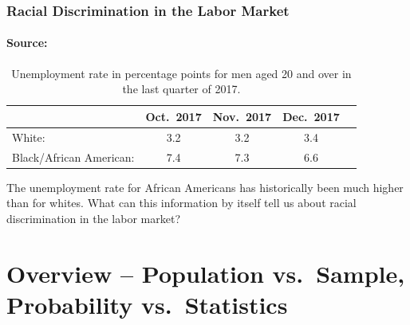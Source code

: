 
\begin{frame}[c]

  \frametitle{Racial Discrimination in the Labor Market}
  \framesubtitle{Source: \href{https://www.bls.gov/news.release/empsit.t02.htm}{}}

  \begin{table}
    \centering
    \begin{tabular}{lcccc}
      \hline
      & Oct.\ 2017 & Nov.\ 2017 & Dec.\ 2017 \\
      \hline
      White: & 3.2 & 3.2 & 3.4\\
      Black/African American: & 7.4 & 7.3 & 6.6\\
      \hline
    \end{tabular}
    \caption{Unemployment rate in percentage points for men aged 20 and over in the last quarter of 2017.}
  \end{table}

  \alert{The unemployment rate for African Americans has historically been much higher than for whites. What can this information by itself tell us about racial discrimination in the labor market?}
\end{frame}


%
%
%
%

\section{Overview -- Population vs.\ Sample, Probability vs.\ Statistics}

